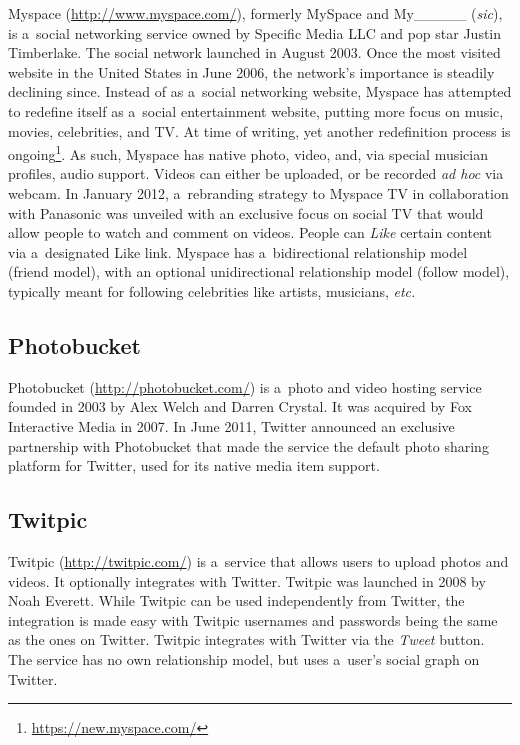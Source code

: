 Myspace (\url{http://www.myspace.com/}),
formerly MySpace and My\_\_\_\_\_ (\emph{sic}), is
a~social networking service owned by Specific Media LLC
and pop star Justin Timberlake.
The social network launched in August 2003.
Once the most visited website
in the United States in June 2006,
the network's importance is steadily declining since.
Instead of as a~social networking website,
Myspace has attempted to redefine itself
as a~social entertainment website,
putting more focus on music, movies, celebrities, and TV.
At time of writing, yet another redefinition process is
ongoing\footnote{\url{https://new.myspace.com/}}.
As such, Myspace has native photo, video, and,
via special musician profiles, audio support.
Videos can either be uploaded,
or be recorded \emph{ad hoc} via webcam.
In January 2012, a~rebranding strategy to Myspace TV
in collaboration with Panasonic was unveiled
with an exclusive focus on social TV that would allow people
to watch and comment on videos.
People can \emph{Like} certain content via a~designated Like link.
Myspace has a~bidirectional relationship model (friend model),
with an optional unidirectional relationship model (follow model),
typically meant for following celebrities like artists,
musicians, \emph{etc.}

\subsection{Photobucket}

Photobucket (\url{http://photobucket.com/})
is a~photo and video hosting service
founded in 2003 by Alex Welch and Darren Crystal.
It was acquired by Fox Interactive Media in 2007.
In June 2011, Twitter announced an exclusive partnership
with Photobucket that made the service
the default photo sharing platform for Twitter,
used for its native media item support.

\subsection{Twitpic}

Twitpic (\url{http://twitpic.com/})
is a~service that allows users to upload photos and videos.
It optionally integrates with Twitter.
Twitpic was launched in 2008 by Noah Everett.
While Twitpic can be used independently from Twitter,
the integration is made easy with Twitpic usernames and passwords
being the same as the ones on Twitter.
Twitpic integrates with Twitter via the \emph{Tweet} button.
The service has no own relationship model,
but uses a~user's social graph on Twitter.

